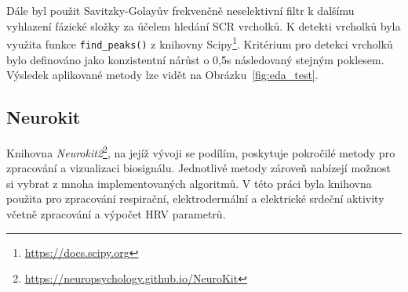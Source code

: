 Dále byl použit Savitzky-Golayův frekvenčně neselektivní filtr k dalšímu
vyhlazení fázické složky za účelem hledání \gls{SCR} vrcholků. K detekti
vrcholků byla využita funkce \texttt{find\_peaks()} z knihovny
Scipy\footnote{\url{https://docs.scipy.org}}. Kritérium pro detekci vrcholků
bylo definováno jako konzistentní nárůst o 0,5s následovaný stejným poklesem.
Výsledek aplikované metody lze vidět na Obrázku~\ref{fig:eda_test}.

\subsection*{Neurokit}
\label{subsec:neurokit}
Knihovna \textit{Neurokit2}\footnote{\url{https://neuropsychology.github.io/NeuroKit}},
na jejíž vývoji se podílím, poskytuje pokročilé metody pro zpracování a
vizualizaci biosignálu. Jednotlivé metody zároveň nabízejí možnost si vybrat z
mnoha implementovaných algoritmů. V této práci byla knihovna použita pro
zpracování respirační, elektrodermální a elektrické srdeční aktivity včetně
zpracování a výpočet \gls{HRV} parametrů.
